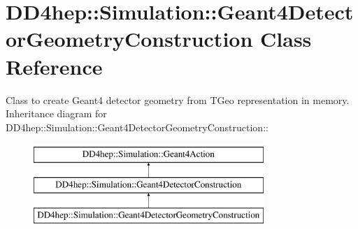 \hypertarget{class_d_d4hep_1_1_simulation_1_1_geant4_detector_geometry_construction}{
\section{DD4hep::Simulation::Geant4DetectorGeometryConstruction Class Reference}
\label{class_d_d4hep_1_1_simulation_1_1_geant4_detector_geometry_construction}
}


Class to create Geant4 detector geometry from TGeo representation in memory.  
Inheritance diagram for DD4hep::Simulation::Geant4DetectorGeometryConstruction::\begin{figure}[H]
\begin{center}
\leavevmode
\includegraphics[height=3cm]{class_d_d4hep_1_1_simulation_1_1_geant4_detector_geometry_construction}
\end{center}
\end{figure}
